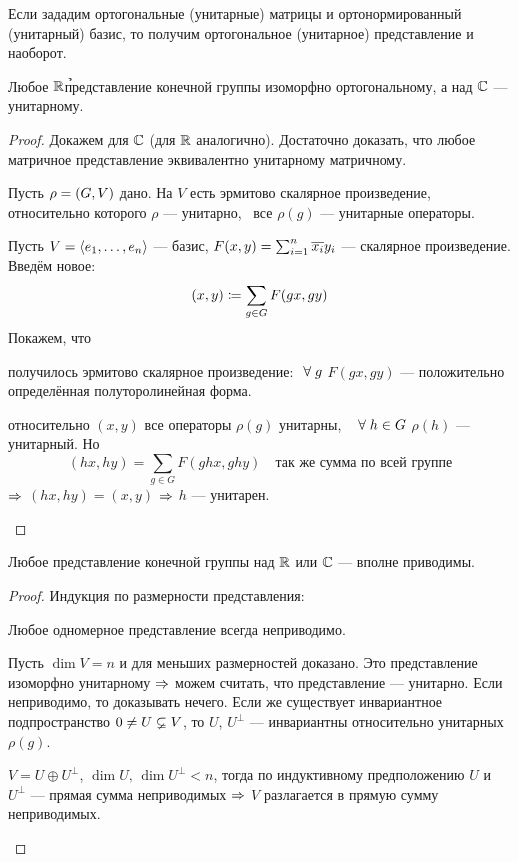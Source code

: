 Если зададим ортогональные (унитарные) матрицы и ортонормированный (унитарный) базис,
то получим ортогональное (унитарное) представление и наоборот.

\begin{theorem}
	Любое $\mathbb{R}$\h представление конечной группы изоморфно ортогональному,
	а над $\mathbb{C}$ --- унитарному.
\end{theorem}
\begin{proof}
Докажем для $\mathbb{C}$ (для $\mathbb{R}$ аналогично).
Достаточно доказать, что любое матричное представление
эквивалентно унитарному матричному.

Пусть $\rho = \left(G, V\right)$ дано.
На $V$ есть эрмитово скалярное произведение,
относительно которого $\rho$ --- унитарно, \ie\
все $\rho(g)$ --- унитарные операторы.

Пусть $V = \left\langle e_1 ,\ldots, e_n\right\rangle$ --- базис,
$F(x, y) = \sum_{i = 1}^n \overline{x_i}y_i$ --- скалярное произведение.
Введём новое:
$$
	(x, y) \coloneqq \sum_{g\in G} F(gx, gy)
$$
Покажем, что
\begin{points}{-3}
	\item получилось эрмитово скалярное произведение:
		$~\forall\; g$ $F(gx, gy)$ --- положительно определённая полуторолинейная форма.
	\item относительно $(x, y)$ все операторы $\rho(g)$ унитарны, \ie\
		$~\forall\; h \in G$ $\rho(h)$ --- унитарный. Но
		$$
			(hx, hy) = \sum_{g \in G} F(ghx, ghy) \quad \text{так же сумма по всей группе}
		$$
		$\Rightarrow$ $(hx, hy) = (x, y)$ $\Rightarrow$ $h$ --- унитарен.
\end{points}
\end{proof}
\begin{imp}
	Любое представление конечной группы над $\mathbb{R}$ или $\mathbb{C}$ --- вполне приводимы.
\end{imp}
\begin{proof}
	Индукция по размерности представления:
	\begin{points}{-3}
		\item Любое одномерное представление всегда неприводимо.
		\item Пусть $\dim V = n$ и для меньших размерностей доказано.
			Это представление изоморфно унитарному $\Rightarrow$
			можем считать, что представление --- унитарно.
			Если неприводимо, то доказывать нечего.
			Если же существует инвариантное подпространство $0 \ne U \varsubsetneq V$,
			то $U$, $U^\perp$ --- инвариантны относительно унитарных $\rho(g)$.

			$V = U \oplus U^\perp$, $\dim U, \, \dim U^\perp < n$,
			тогда по индуктивному предположению $U$ и $U^\perp$ --- прямая сумма неприводимых
			$\Rightarrow$ $V$ разлагается в прямую сумму неприводимых.
	\end{points}
\end{proof}


